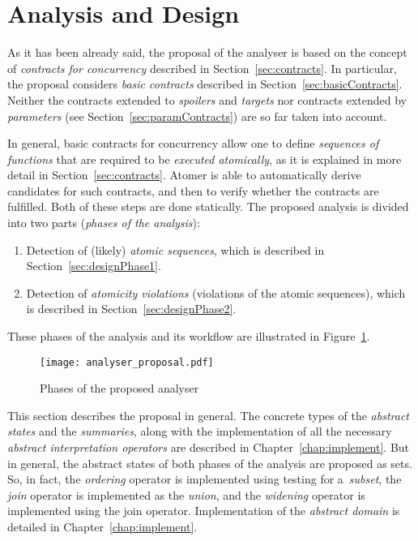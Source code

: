 \section{Analysis and Design}
\label{sec:design}

As it has been already said, the proposal of the analyser is based on
the concept of \emph{contracts for concurrency} described in
Section~\ref{sec:contracts}. In particular, the proposal considers
\emph{basic contracts} described in Section~\ref{sec:basicContracts}.
Neither the contracts extended to \emph{spoilers} and \emph{targets}
nor contracts extended by \emph{parameters} (see
Section~\ref{sec:paramContracts}) are so far taken into account.

In general, basic contracts for concurrency allow one to define
\emph{sequences of functions} that are required to be \emph{executed
atomically}, as it is explained in more detail in Section~\ref{sec:contracts}.
Atomer is able to automatically derive candidates for such contracts, and
then to verify whether the contracts are fulfilled. Both of these steps
are done statically. The proposed analysis is divided into two parts
(\emph{phases of the analysis}):
\begin{enumerate}[label={\textbf{Phase \arabic*}:}, leftmargin=6em]
    \item
        Detection of (likely) \emph{atomic sequences}, which is described
        in Section~\ref{sec:designPhase1}.

    \item
        Detection of \emph{atomicity violations} (violations of the atomic
        sequences), which is described in Section~\ref{sec:designPhase2}.
\end{enumerate}
These phases of the analysis and its workflow are illustrated in
Figure~\ref{fig:analyserPhases}.

\begin{figure}[hbt]
    \centering
    \texttt{[image: analyser\_proposal.pdf]}
    \caption{Phases of the proposed analyser}
    \label{fig:analyserPhases}
\end{figure}

This section describes the proposal in general. The concrete types
of the \emph{abstract states} and the \emph{summaries}, along with the
implementation of all the necessary \emph{abstract interpretation
operators} are described in Chapter~\ref{chap:implement}. But
in general, the abstract states of both phases of the analysis
are proposed as sets. So, in fact, the \emph{ordering} operator
is implemented using testing for a~\emph{subset}, the \emph{join}
operator is implemented as the \emph{union}, and the \emph{widening}
operator is implemented using the join operator. Implementation of the
\emph{abstract domain} is detailed in Chapter~\ref{chap:implement}.

